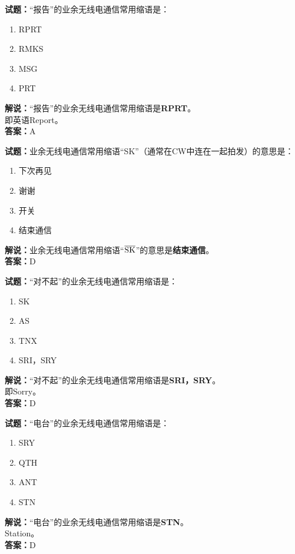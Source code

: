 \documentclass{ctexbook}
\begin{document}
\bigskip


\noindent\textbf{试题：}“报告”的业余无线电通信常用缩语是：
\begin{enumerate}[leftmargin=3em]
\item RPRT
\item RMKS
\item MSG
\item PRT
\end{enumerate}
\noindent\textbf{解说：}“报告”的业余无线电通信常用缩语是\textbf{RPRT}。\\即英语Report。\\\noindent\textbf{答案：}A





\bigskip


\noindent\textbf{试题：}业余无线电通信常用缩语“SK”（通常在CW中连在一起拍发）的意思是：
\begin{enumerate}[leftmargin=3em]
\item 下次再见
\item 谢谢
\item 开关
\item 结束通信
\end{enumerate}
\noindent\textbf{解说：}业余无线电通信常用缩语“$\overline{\rm SK}$”的意思是\textbf{结束通信}。\\\noindent\textbf{答案：}D




\bigskip


\noindent\textbf{试题：}“对不起”的业余无线电通信常用缩语是：
\begin{enumerate}[leftmargin=3em]
\item SK
\item AS
\item TNX
\item SRI，SRY
\end{enumerate}
\noindent\textbf{解说：}“对不起”的业余无线电通信常用缩语是\textbf{SRI，SRY}。\\即Sorry。\\\noindent\textbf{答案：}D



\bigskip


\noindent\textbf{试题：}“电台”的业余无线电通信常用缩语是：
\begin{enumerate}[leftmargin=3em]
\item SRY
\item QTH
\item ANT
\item STN
\end{enumerate}
\noindent\textbf{解说：}“电台”的业余无线电通信常用缩语是\textbf{STN}。\\Station。\\\noindent\textbf{答案：}D
\end{document}
